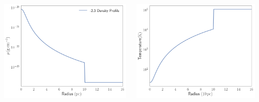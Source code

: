 \documentclass{beamer}
\begin{document}
\begin{frame}{}%
	\begin{columns}
		
\begin{center}
	\includegraphics[width=1\linewidth]{../Document/DataImages/SimRHOProfile}
\end{center}
		
\begin{center}
	\includegraphics[width=1\linewidth]{../Document/DataImages/SimTMPProfile}
\end{center}
	\end{columns}
\end{frame}
	
\end{document}
